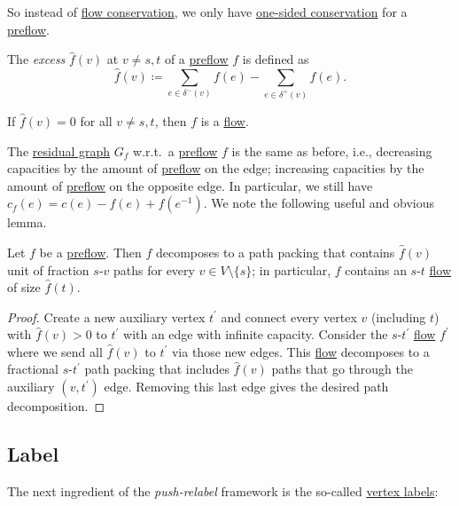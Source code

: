 So instead of \hyperref[def:flow-conservation]{flow conservation}, we only have \hyperref[def:preflow-conservation]{one-sided conservation} for a \hyperref[def:preflow]{preflow}.

\begin{definition}[Excess]\label{def:excess}
	The \emph{excess} \(\hat{f} (v)\) at \(v \neq s, t\) of a \hyperref[def:preflow]{preflow} \(f\) is defined as
	\[
		\hat{f} (v)
		\coloneqq \sum_{e \in \delta ^-(v)} f(e) - \sum_{e \in \delta ^+(v)} f(e).
	\]
\end{definition}

\begin{eg}
	If \(\hat{f} (v) = 0\) for all \(v \neq s, t\), then \(f\) is a \hyperref[def:flow]{flow}.
\end{eg}

The \hyperref[def:residual-graph]{residual graph} \(G_f\) w.r.t.\ a \hyperref[def:preflow]{preflow} \(f\) is the same as before, i.e., decreasing capacities by the amount of \hyperref[def:preflow]{preflow} on the edge; increasing capacities by the amount of \hyperref[def:preflow]{preflow} on the opposite edge. In particular, we still have \(c_f (e) = c(e) - f(e) + f(e^{-1} )\). We note the following useful and obvious lemma.

\begin{lemma}\label{lma:preflow}
	Let \(f\) be a \hyperref[def:preflow]{preflow}. Then \(f\) decomposes to a path packing that contains \(\hat{f} (v)\) unit of fraction \(s\)-\(v\) paths for every \(v \in V\setminus \{ s \} \); in particular, \(f\) contains an \(s\)-\(t\) \hyperref[def:flow]{flow} of size \(\hat{f} (t)\).
\end{lemma}
\begin{proof}
	Create a new auxiliary vertex \(t^{\prime} \) and connect every vertex \(v\) (including \(t\)) with \(\hat{f} (v) > 0\) to \(t^{\prime} \) with an edge with infinite capacity. Consider the \(s\)-\(t^{\prime} \) \hyperref[def:flow]{flow} \(f^{\prime} \) where we send all \(\hat{f} (v)\) to \(t^{\prime} \) via those new edges. This \hyperref[def:flow]{flow} decomposes to a fractional \(s\)-\(t^{\prime} \) path packing that includes \(\hat{f} (v)\) paths that go through the auxiliary \((v, t^{\prime} )\) edge. Removing this last edge gives the desired path decomposition.
\end{proof}

\subsection{Label}
The next ingredient of the \emph{push-relabel} framework is the so-called \hyperref[def:label]{vertex labels}:

